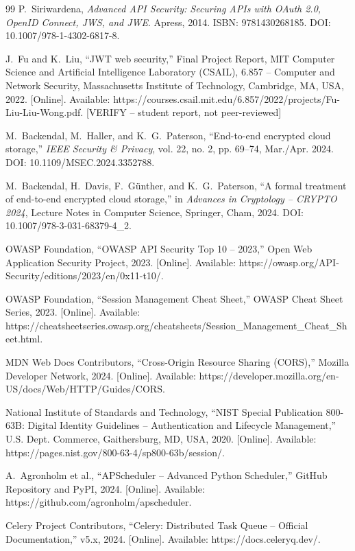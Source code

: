 \documentclass[12pt, a4paper]{article}
\begin{document}
\begin{thebibliography}{99}
P.~Siriwardena, \textit{Advanced API Security: Securing APIs with OAuth 2.0, OpenID Connect, JWS, and JWE}. Apress, 2014. ISBN: 9781430268185. DOI: 10.1007/978-1-4302-6817-8.

J.~Fu and K.~Liu, ``JWT web security,'' Final Project Report, MIT Computer Science and Artificial Intelligence Laboratory (CSAIL), 6.857 -- Computer and Network Security, Massachusetts Institute of Technology, Cambridge, MA, USA, 2022. [Online]. Available: https://courses.csail.mit.edu/6.857/2022/projects/Fu-Liu-Liu-Wong.pdf. [VERIFY -- student report, not peer-reviewed]

M.~Backendal, M.~Haller, and K.~G.~Paterson, ``End-to-end encrypted cloud storage,'' \textit{IEEE Security \& Privacy}, vol. 22, no. 2, pp. 69--74, Mar./Apr. 2024. DOI: 10.1109/MSEC.2024.3352788.

M.~Backendal, H.~Davis, F.~G\"{u}nther, and K.~G.~Paterson, ``A formal treatment of end-to-end encrypted cloud storage,'' in \textit{Advances in Cryptology -- CRYPTO 2024}, Lecture Notes in Computer Science, Springer, Cham, 2024. DOI: 10.1007/978-3-031-68379-4\_2.

OWASP Foundation, ``OWASP API Security Top 10 -- 2023,'' Open Web Application Security Project, 2023. [Online]. Available: https://owasp.org/API-Security/editions/2023/en/0x11-t10/.

OWASP Foundation, ``Session Management Cheat Sheet,'' OWASP Cheat Sheet Series, 2023. [Online]. Available: https://cheatsheetseries.owasp.org/cheatsheets/Session\_Management\_Cheat\_Sheet.html.

MDN Web Docs Contributors, ``Cross-Origin Resource Sharing (CORS),'' Mozilla Developer Network, 2024. [Online]. Available: https://developer.mozilla.org/en-US/docs/Web/HTTP/Guides/CORS.

National Institute of Standards and Technology, ``NIST Special Publication 800-63B: Digital Identity Guidelines -- Authentication and Lifecycle Management,'' U.S. Dept. Commerce, Gaithersburg, MD, USA, 2020. [Online]. Available: https://pages.nist.gov/800-63-4/sp800-63b/session/.

A.~Agronholm et al., ``APScheduler -- Advanced Python Scheduler,'' GitHub Repository and PyPI, 2024. [Online]. Available: https://github.com/agronholm/apscheduler.

Celery Project Contributors, ``Celery: Distributed Task Queue -- Official Documentation,'' v5.x, 2024. [Online]. Available: https://docs.celeryq.dev/.


\end{thebibliography}
\end{document}

